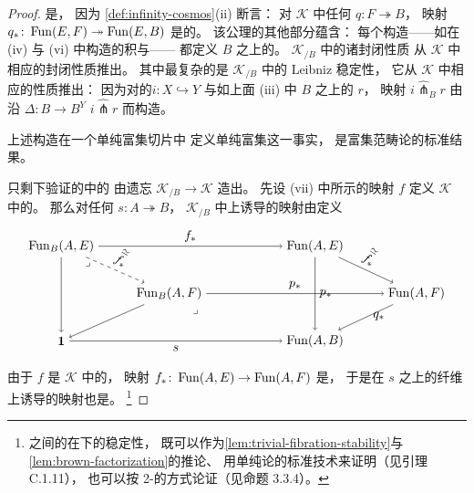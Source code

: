 \begin{proof}
\trFunctorSpace{}是\trQuasiCategory{}，
因为 \cref{def:infinity-cosmos}(ii) 断言：
对 $\mathcal{K}$ 中任何\trIsofibration{} $q\colon F\twoheadrightarrow B$，
映射 $q_\ast\colon\operatorname{Fun}(E,F)\twoheadrightarrow\operatorname{Fun}(E,B)$
是\trQuasiCategory{}的\trIsofibration{}。
该公理的其他部分蕴含：
每个\trLimit{}构造——如在 (iv) 与 (vi) 中构造的积与\trCotensor——
都定义 $B$ 之上的\trIsofibration{}。
$\mathcal{K}_{/B}$ 中\trIsofibration{}的诸封闭性质
从 $\mathcal{K}$ 中相应的封闭性质推出。
其中最复杂的是 $\mathcal{K}_{/B}$ 中\trIsofibration{}的
Leibniz \trCotensor{}稳定性，
它从 $\mathcal{K}$ 中相应的性质推出：
因为对\trSimplicialSet{}的\trMonomorphism $i\colon X\hookrightarrow Y$
与如上面 (iii) 中 $B$ 之上的\trIsofibration{} $r$，
映射 $i\widehat{\pitchfork}_B r$
由沿 $\Delta\colon B\to B^Y$ \trPullback $i\widehat{\pitchfork} r$ 而构造。

上述构造在一个单纯富集切片\trCategory{}中
定义单纯富集\trLimit{}这一事实，
是富集范畴论的标准结果。

只剩下验证\trIsofibration{}的\trInfinityCosmos{}中的%
\trEquivalence{}由遗忘\trFunctor{} $\mathcal{K}_{/B}\to\mathcal{K}$ 造出。
先设 (vii) 中所示的映射 $f$ 定义 $\mathcal{K}$ 中的\trEquivalence{}。
那么对任何\trIsofibration{} $s\colon A\twoheadrightarrow B$，
$\mathcal{K}_{/B}$ 中\trFunctorSpace{}上诱导的映射由\trPullback{}定义
\begin{equation*}
\begin{tikzpicture}[xscale=1.75,yscale=1.3]
\node (TL) at (0,2) {$\Fun_B(A,E)$};
\node (TR) at (4,2) {$\Fun(A,E)$};
\node (ML) at (1.7,1) {$\Fun_B(A,F)$};
\node (MR) at (5.6,1) {$\Fun(A,F)$};
\node (BL) at (0,0) {$\mathbf{1}$};
\node (BR) at (4,0) {$\Fun(A,B)$};
\draw[->] (TL) -- (TR) node[midway,above]{$f_\ast$};
\draw[->] (TL) -- (BL);
\draw[dashed,->] (TL) -- (ML) node[pos=0.5,above,sloped]{$\overset{\simeq}{f_\ast}$};
\draw[->] (ML) -- (MR) node[midway,above]{$p_\ast$};
\draw[->] (ML) -- (BL);
\draw[->] (TR) -- (MR) node[pos=0.45,above,sloped]{$\overset{\simeq}{f_\ast}$};
\draw[->] (TR) -- (BR) node[midway,right]{$p_\ast$};
\draw[->] (MR) -- (BR) node[pos=0.45,right]{$q_\ast$};
\draw[->] (BL) -- (BR) node[midway,below]{$s$};
\node at (0.42,1.62) {$\scriptstyle\lrcorner$};
\node at (2.12,0.62) {$\scriptstyle\lrcorner$};
\end{tikzpicture}
\end{equation*}
由于 $f$ 是 $\mathcal{K}$ 中的\trEquivalence{}，
映射 $f_\ast\colon\operatorname{Fun}(A,E)\to\operatorname{Fun}(A,F)$ 是\trEquivalence{}，
于是在 $s$ 之上的纤维上诱导的映射也是\trEquivalence{}。%
\footnote{\trIsofibration{}之间的\trEquivalence{}在\trPullback{}下的稳定性，
既可以作为\cref{lem:trivial-fibration-stability}与 \cref{lem:brown-factorization}的推论、
用单纯\trHomotopy{}论的标准技术来证明（见引理 C.1.11），
也可以按 2-\trCategory{}的方式论证（见命题 3.3.4）。}


\end{proof}

